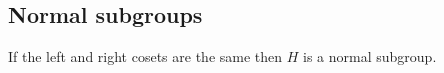 \subsection{Normal subgroups}

If the left and right cosets are the same then \(H\) is a normal subgroup.


